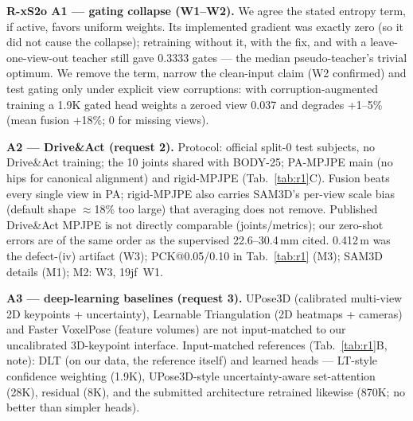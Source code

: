 \documentclass[10pt,twocolumn,letterpaper]{article}
\newcommand{\rpoint}[1]{\noindent\textbf{#1}\;}
\begin{document}
\rpoint{R-xS2o A1 --- gating collapse (W1--W2).}
We agree the stated entropy term, if active, favors uniform weights. Its implemented gradient was exactly zero (so it did not cause the collapse); retraining without it, with the fix, and with a leave-one-view-out teacher still gave 0.3333 gates --- the median pseudo-teacher's trivial optimum. We remove the term, narrow the clean-input claim (W2 confirmed) and test gating only under explicit view corruptions: with corruption-augmented training a 1.9K gated head weights a zeroed view 0.037 and degrades +1--5\% (mean fusion +18\%; 0 for missing views).

\rpoint{A2 --- Drive\&Act (request 2).}
Protocol: official split-0 test subjects, no Drive\&Act training; the 10 joints shared with BODY-25; PA-MPJPE main (no hips for canonical alignment) and rigid-MPJPE (Tab.~\ref{tab:r1}C). Fusion beats every single view in PA; rigid-MPJPE also carries SAM3D's per-view scale bias (default shape $\approx$18\% too large) that averaging does not remove. Published Drive\&Act MPJPE is not directly comparable (joints/metrics); our zero-shot errors are of the same order as the supervised 22.6--30.4\,mm cited. 0.412\,m was the defect-(iv) artifact (W3); PCK@0.05/0.10 in Tab.~\ref{tab:r1} (M3); SAM3D details (M1); M2: W3, 19jf~W1.

\rpoint{A3 --- deep-learning baselines (request 3).}
UPose3D (calibrated multi-view 2D keypoints + uncertainty), Learnable Triangulation (2D heatmaps + cameras) and Faster VoxelPose (feature volumes) are not input-matched to our uncalibrated 3D-keypoint interface. Input-matched references (Tab.~\ref{tab:r1}B, note): DLT (on our data, the reference itself) and learned heads --- LT-style confidence weighting (1.9K), UPose3D-style uncertainty-aware set-attention (28K), residual (8K), and the submitted architecture retrained likewise (870K; no better than simpler heads).
\end{document}

